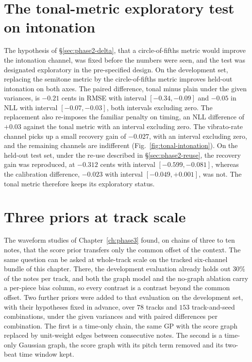 \section{The tonal-metric exploratory test on intonation}\label{app:tonal}
The hypothesis of \S\ref{sec:phase2-delta}, that a circle-of-fifths metric
would improve the intonation channel, was fixed before the numbers were
seen, and the test was designated exploratory in the pre-specified design.
On the development set, replacing the semitone metric by the
circle-of-fifths metric improves held-out intonation on both axes. The
paired difference, tonal minus plain under the given variances, is $-0.21$
cents in RMSE with interval $[-0.34, -0.09]$ and $-0.05$ in NLL with
interval $[-0.07, -0.03]$, both intervals excluding zero. The replacement
also re-imposes the familiar penalty on timing, an NLL difference of
$+0.03$ against the tonal metric with an interval excluding zero. The
vibrato-rate channel picks up a small recovery gain of $-0.027$, with an
interval excluding zero, and the remaining channels are indifferent
(Fig.~\ref{fig:tonal-intonation}). On the held-out test set, under the
re-use described in \S\ref{sec:phase2-reuse}, the recovery gain was
reproduced, at $-0.312$ cents with interval $[-0.599, -0.081]$, whereas the
calibration difference, $-0.023$ with interval $[-0.049, +0.001]$, was not.
The tonal metric therefore keeps its exploratory status.


\section{Three priors at track scale}
\label{app:trackscale}
The waveform studies of Chapter~\ref{ch:phase3} found, on chains of three
to ten notes, that the score prior transfers only the common offset of the
context. The same question can be asked at whole-track scale on the tracked
six-channel bundle of this chapter. There, the development evaluation
already holds out $30\%$ of the notes per track, and both the graph model
and the no-graph ablation carry a per-piece bias column, so every contrast
is a contrast beyond the common offset. Two further priors were added to
that evaluation on the development set, with their hypotheses fixed in
advance, over $78$ tracks and $153$ track-and-seed combinations, under the
given variances and with paired differences per combination. The first is
a time-only chain, the same GP with the score graph replaced by unit-weight
edges between consecutive notes. The second is a time-only Gaussian graph,
the score graph with its pitch term removed and its two-beat time window
kept.

